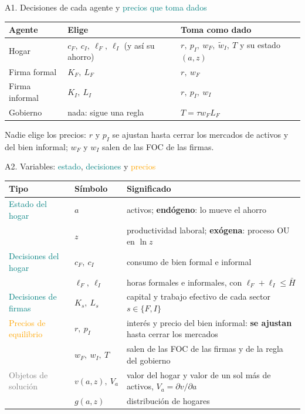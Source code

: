 \documentclass[aspectratio=169,11pt]{beamer}
\newcommand{\teal}[1]{\textcolor{Teal}{#1}}
\newcommand{\orange}[1]{\textcolor{Orange}{#1}}
\newcommand{\gray}[1]{\textcolor{Gray}{#1}}
\begin{document}
\begin{frame}[label=a1]{A1. Decisiones de cada agente y \teal{precios que toma dados}}
\renewcommand{\arraystretch}{1.4}
\begin{tabular}{@{}p{38mm}p{58mm}p{66mm}@{}}
\toprule
\textbf{Agente} & \textbf{Elige} & \textbf{Toma como dado}\\
\midrule
Hogar & $c_F,\ c_I,\ \ell_F,\ \ell_I$ (y así su ahorro) & $r,\ p_I,\ w_F,\ \widetilde w_I,\ T$ y su estado $(a,z)$\\
Firma formal & $K_F,\ L_F$ & $r,\ w_F$\\
Firma informal & $K_I,\ L_I$ & $r,\ p_I,\ w_I$\\
Gobierno & nada: sigue una regla & $T=\tau w_FL_F$\\
\bottomrule
\end{tabular}\par
\vspace{5mm}
Nadie elige los precios: $r$ y $p_I$ se ajustan hasta cerrar los mercados de activos y del bien informal; $w_F$ y $w_I$ salen de las FOC de las firmas.
\end{frame}

\begin{frame}[label=avar]{A2. Variables: \teal{estado}, \teal{decisiones} y \orange{precios}}
\small
\renewcommand{\arraystretch}{1.3}
\begin{tabular}{@{}p{33mm}p{35mm}p{98mm}@{}}
\toprule
\textbf{Tipo} & \textbf{Símbolo} & \textbf{Significado}\\
\midrule
\teal{Estado del hogar} & $a$ & activos; \textbf{endógeno}: lo mueve el ahorro\\
 & $z$ & productividad laboral; \textbf{exógena}: proceso OU en $\ln z$\\
\teal{Decisiones del hogar} & $c_F,\ c_I$ & consumo de bien formal e informal\\
 & $\ell_F,\ \ell_I$ & horas formales e informales, con $\ell_F+\ell_I\le\bar H$\\
\teal{Decisiones de firmas} & $K_s,\ L_s$ & capital y trabajo efectivo de cada sector $s\in\{F,I\}$\\
\orange{Precios de equilibrio} & $r,\ p_I$ & interés y precio del bien informal: \textbf{se ajustan} hasta cerrar los mercados\\
 & $w_F,\ w_I,\ T$ & salen de las FOC de las firmas y de la regla del gobierno\\
\gray{Objetos de solución} & $v(a,z),\ V_a$ & valor del hogar y valor de un sol más de activos, $V_a=\partial v/\partial a$\\
 & $g(a,z)$ & distribución de hogares\\
\bottomrule
\end{tabular}
\end{frame}
\end{document}

